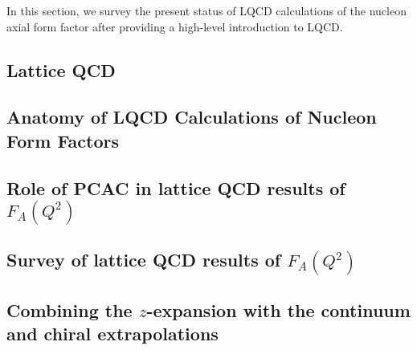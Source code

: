 In this section, we survey the present status of LQCD calculations of the nucleon axial form factor after providing a high-level introduction to LQCD.
\subsection{Lattice QCD\label{sec:lqcd_intro}}


\subsection{Anatomy of LQCD Calculations of Nucleon Form Factors\label{sec:calc_anatomy}}


\subsection{Role of PCAC in lattice QCD results of $F_A(Q^2)$\label{sec:lqcd_pcac}}


\subsection{Survey of lattice QCD results of $F_A(Q^2)$\label{sec:lqcd_results}}


\subsection{Combining the $z$-expansion with the continuum and chiral extrapolations\label{sec:z_continuum}}

